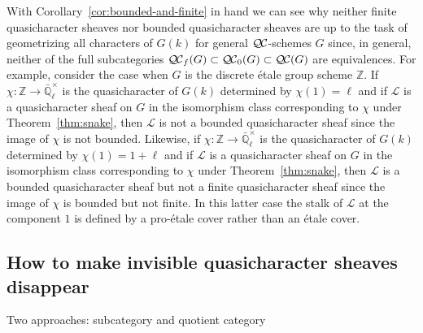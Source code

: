 \documentclass{amsart}
\theoremstyle{plain}
\theoremstyle{definition}
\theoremstyle{remark}
\newcommand{\ZZ}{{\mathbb{Z}}}
\newcommand{\EE}{\mathbb{\bar Q}_\ell}
\newcommand{\Fq}{k}
\newcommand{\EEx}{\EE^\times}
\newcommand{\qcs}[1]{{\mathcal{#1}}}
\newcommand{\QC}{{\mathcal{Q\hskip-0.8pt C}}}
\newcommand{\QCb}{{\QC_0}}
\newcommand{\QCf}{{\QC_f}}
\begin{document}
With Corollary~\ref{cor:bounded-and-finite} in hand
we can see why neither finite quasicharacter sheaves nor bounded quasicharacter sheaves
are up to the task of geometrizing all characters of $G(\Fq)$ for general $\QC$-schemes $G$ since, in general, neither of the full subcategories
$\QCf(G) \subset \QCb(G) \subset \QC(G)$ are equivalences.
For example, consider the case when $G$ is the discrete \'etale group scheme $\ZZ$.
If $\chi : \ZZ \to \EEx$ is the quasicharacter of $G(\Fq)$ determined by $\chi(1) = \ell$
and if $\qcs{L}$ is a quasicharacter sheaf on $G$ in the isomorphism class
corresponding to $\chi$ under Theorem~\ref{thm:snake},
then $\qcs{L}$ is not a bounded quasicharacter sheaf since the image of $\chi$ is not
bounded.
Likewise, if $\chi : \ZZ \to \EEx$ is the quasicharacter of $G(\Fq)$ determined by $\chi(1) = 1+\ell$
and if $\qcs{L}$ is a quasicharacter sheaf on $G$ in the isomorphism class
corresponding to $\chi$ under Theorem~\ref{thm:snake},
then $\qcs{L}$ is a bounded quasicharacter sheaf but not a finite quasicharacter sheaf
since the image of $\chi$ is bounded but not finite.
In this latter case the stalk of $\qcs{L}$ at the component $1$ is defined
by a pro-\'etale cover rather than an \'etale cover.

\subsection{How to make invisible quasicharacter sheaves disappear}

Two approaches: subcategory and quotient category



\end{document}
